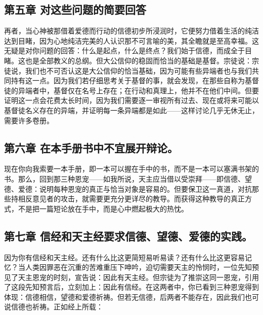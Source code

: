 
\subsection{第五章 对这些问题的简要回答}

再者，当心神被那借着爱德而行动的信德初步所浸润时，它便努力借着生活的纯洁达到目睹，因为心地纯洁完美的人认识那不可言喻的美，其全瞻就是至高幸福。这无疑是对你问题的回答：什么是起点，什么是终点？我们始于信德，而成全于目睹。这也是全部教义的总纲。但大公信仰的稳固而恰当的基础是基督。宗徒说：宗徒说，我们也不可否认这是大公信仰的恰当基础，因为可能有些异端者也与我们共同持有这一点。因为我们若仔细思考关于基督的事，就会发现，在那些自称为基督徒的异端者中，基督仅在名号上存在；在行动和真理上，他并不在他们中间。但要证明这一点会花费太长时间，因为我们需要逐一审视所有过去、现在或将来可能以基督徒名义存在的异端，并证明每一条异端都是如此——这样讨论几乎无休无止，需要许多卷册。\par


\subsection{第六章 在本手册书中不宜展开辩论。}

现在你向我索要一本手册，即一本可以握在手中的书，而不是一本可以塞满书架的书。那么，回到那三种恩宠——如我所说，天主应当借以受崇拜——即信德、望德、爱德：说明每种恩宠的真正与恰当对象是容易的。但要保卫这一真道，对抗那些持相反意见者的攻击，就需要更充分更详尽的教导。而获得这种教导的真正方式，不是把一篇短论放在手中，而是心中燃起极大的热忱。\par


\subsection{第七章 信经和天主经要求信德、望德、爱德的实践。}

因为你有信经和天主经。还有什么比这更简短易听易读？还有什么比这更容易记忆？当人类因罪恶在沉重的苦难重压下呻吟，迫切需要天主的怜悯时，一位先知预见了天主恩宠的时刻，宣告说：因此有天主经。但宗徒为了推崇这同一恩宠，引用了这段先知预言后，立刻加上：因此有信经。在这两者中，你已看到三种恩宠得到体现：信德相信，望德和爱德祈祷。但若无信德，后两者不能存在，因此我们也可说信德也祈祷。正如经上所载：\par

